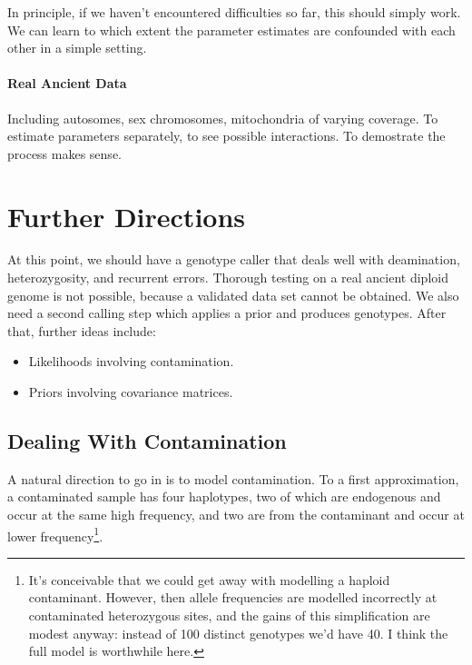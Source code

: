 \documentclass{article}
\begin{document}
In principle, if we haven't encountered difficulties so far, this should
simply work.  We can learn to which extent the parameter estimates are
confounded with each other in a simple setting.

\paragraph{Real Ancient Data}

Including autosomes, sex chromosomes, mitochondria of
varying coverage.  To estimate parameters separately, to see possible
interactions.  To demostrate the process makes sense. 


\section{Further Directions}

At this point, we should have a genotype caller that deals well with
deamination, heterozygosity, and recurrent errors.  Thorough testing on
a real ancient diploid genome is not possible, because a validated data
set cannot be obtained.  We also need a second calling step which
applies a prior and produces genotypes.  After that, further ideas
include: 

\begin{itemize}
\item Likelihoods involving contamination.
\item Priors involving covariance matrices.
\end{itemize}

\subsection{Dealing With Contamination}

A natural direction to go in is to model contamination.  To a first
approximation, a contaminated sample has four haplotypes, two of which
are endogenous and occur at the same high frequency, and two are from
the contaminant and occur at lower frequency\footnote{It's conceivable
that we could get away with modelling a haploid contaminant.  However,
then allele frequencies are modelled incorrectly at contaminated
heterozygous sites, and the gains of this simplification are modest
anyway:  instead of 100 distinct genotypes we'd have 40.  I think the
full model is worthwhile here.}.
\end{document}
